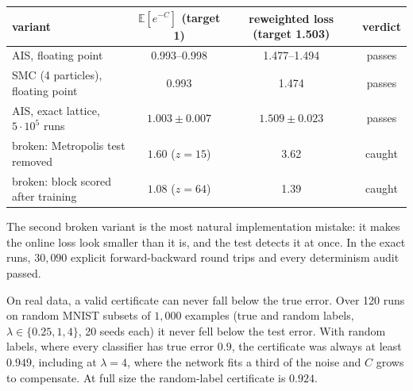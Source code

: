 \documentclass[11pt]{article}
\theoremstyle{definition}
\theoremstyle{remark}
\newcommand{\E}{\mathbb{E}}
\begin{document}
\begin{center}\small
\begin{tabular}{@{}lccc@{}}
\toprule
variant & $\E[e^{-C}]$ (target 1) & reweighted loss (target 1.503) & verdict\\
\midrule
AIS, floating point & 0.993--0.998 & 1.477--1.494 & passes\\
SMC (4 particles), floating point & 0.993 & 1.474 & passes\\
AIS, exact lattice, $5\cdot10^5$ runs & $1.003\pm0.007$ & $1.509\pm0.023$ & passes\\
broken: Metropolis test removed & $1.60$ ($z=15$) & 3.62 & caught\\
broken: block scored after training & $1.08$ ($z=64$) & 1.39 & caught\\
\bottomrule
\end{tabular}
\end{center}
The second broken variant is the most natural implementation mistake: it makes the online loss look smaller than it is,
and the test detects it at once. In the exact runs, $30{,}090$ explicit forward-backward round trips and every
determinism audit passed.

On real data, a valid certificate can never fall below the true error. Over 120 runs on random MNIST subsets of
$1{,}000$ examples (true and random labels, $\lambda\in\{0.25,1,4\}$, 20 seeds each) it never fell below the test error.
With random labels, where every classifier has true error $0.9$, the certificate was always at least $0.949$, including at
$\lambda=4$, where the network fits a third of the noise and $C$ grows to compensate. At full size the random-label
certificate is $0.924$.
\end{document}
